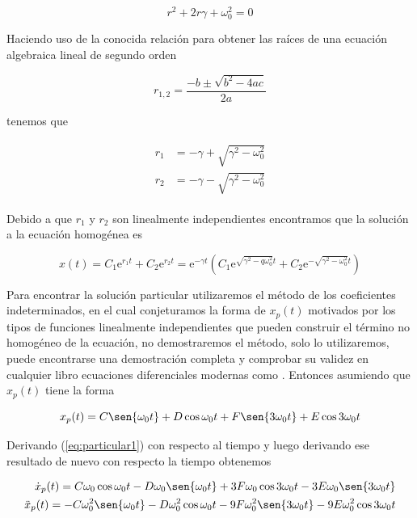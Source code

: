 \documentclass[a4paper,10pt]{article}
\newcommand{\euler}{\mathrm{e}}
\begin{document}
\begin{equation}
  r^2 + 2r\gamma + \omega_0^2 = 0
 \label{eq:ecuacionCaracteristica1}
\end{equation}

Haciendo uso de la conocida relación para obtener las raíces de una ecuación
algebraica lineal de segundo orden

$$
r_{1,2} = \frac{-b \pm \sqrt{b^2-4ac}}{2a}
$$

tenemos que 

\begin{align}
\begin{split}
%
r_1 &= - \gamma + \sqrt{\gamma^2 - \omega_0^2} \\
%
r_2 &= - \gamma - \sqrt{\gamma^2 - \omega_0^2}
%
\end{split}
\end{align}

Debido a que $r_1$ y $r_2$ son linealmente independientes encontramos que la solución
a la ecuación homogénea es 

\begin{equation}
 x(t) = C_1 \euler^{r_1 t} + C_2 \euler^{r_2 t} = \euler^{-\gamma t} (C_1 \euler^{\sqrt{\gamma^2 -q \omega_0^2}t}
 + C_2 \euler^{-\sqrt{\gamma^2 - \omega_0^2}t})
\end{equation}

Para encontrar la solución particular utilizaremos el método de los coeficientes indeterminados, 
en el cual conjeturamos la forma de $x_p (t)$ motivados por los tipos de funciones linealmente
independientes que pueden construir el término no homogéneo de la ecuación, no demostraremos
el método, solo lo utilizaremos, puede encontrarse una demostración completa y comprobar
su validez en cualquier libro ecuaciones diferenciales modernas como \cite{zill}. Entonces
asumiendo que $x_p (t)$ tiene la forma

\begin{equation}
 x_p (t) = C \sen{\omega_0t} + D \cos{\omega_0t} + F \sen{3 \omega_0t} + E \cos{3 \omega_0t}
 \label{eq:particular1}
\end{equation}

Derivando (\ref{eq:particular1}) con respecto al tiempo y luego derivando ese resultado de nuevo
con respecto la tiempo obtenemos

\begin{align}
 \begin{split}
  \dot{x}_p (t) = C \omega_0 \cos{\omega_0t} - D\omega_0 \sen{\omega_0t} + 
  3F\omega_0 \cos{3 \omega_0t} - 3E\omega_0 \sen{3 \omega_0t} \\
  \ddot{x}_p (t) = - C\omega_0^2 \sen{\omega_0t} - D\omega_0^2 \cos{\omega_0t} - 
  9F\omega_0^2 \sen{3 \omega_0t} - 9E\omega_0^2 \cos{3 \omega_0t} 
  \label{eq:particular2}
 \end{split}
\end{align}
\end{document}
